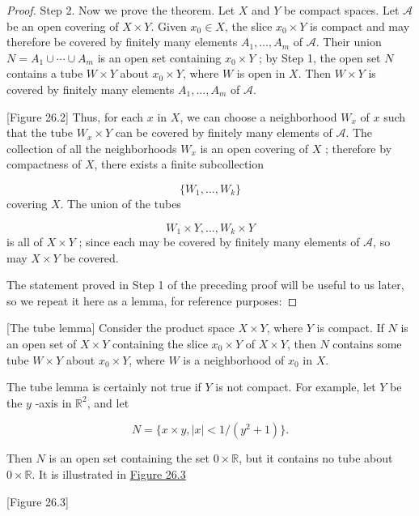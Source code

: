 \begin{proof}
Step 2. Now we prove the theorem. Let \(X\) and \(Y\) be compact spaces. Let \(\mathcal{A}\) be an open covering of \(X \times Y\). Given \(x_{0} \in X\), the slice \(x_{0} \times Y\) is compact and may therefore be covered by finitely many elements \(A_{1},\ldots ,A_{m}\) of \(\mathcal{A}\). Their union \(N = A_{1} \cup \cdots \cup {A}_{m}\) is an open set containing \(x_{0} \times Y\) ; by Step 1, the open set \(N\) contains a tube \(W \times Y\) about \(x_{0} \times Y\), where \(W\) is open in \(X\). Then \(W \times Y\) is covered by finitely many elements \(A_{1},\ldots ,A_{m}\) of \(\mathcal{A}\).

[Figure 26.2]
Thus, for each \(x\) in \(X\), we can choose a neighborhood \(W_{x}\) of \(x\) such that the tube \(W_{x} \times Y\) can be covered by finitely many elements of \(\mathcal{A}\). The collection of all the neighborhoods \(W_{x}\) is an open covering of \(X\) ; therefore by compactness of \(X\), there exists a finite subcollection

\[
\{ {W_{1},\ldots ,W_{k}}\}
\]
covering \(X\). The union of the tubes

\[
W_{1} \times Y,\ldots ,W_{k} \times Y
\]
is all of \(X \times Y\) ; since each may be covered by finitely many elements of \(\mathcal{A}\), so may \(X \times Y\) be covered.

The statement proved in Step 1 of the preceding proof will be useful to us later, so we repeat it here as a lemma, for reference purposes:
\end{proof}

\begin{lemma}
\label{lem:\thetheorem}[The tube lemma]
 Consider the product space \(X \times Y\), where \(Y\) is compact. If \(N\) is an open set of \(X \times Y\) containing the slice \(x_{0} \times Y\) of \(X \times Y\), then \(N\) contains some tube \(W \times Y\) about \(x_{0} \times Y\), where \(W\) is a neighborhood of \(x_{0}\) in \(X\).
\end{lemma}

\begin{centeredblock}
\begin{example}
\label{ex:\thesection.\theexample}
 The tube lemma is certainly not true if \(Y\) is not compact. For example, let \(Y\) be the \(y\) -axis in \(\mathbb{R}^{2}\), and let

\[
N = \{ {x \times y,| x| < 1/( {y^{2} + 1}) }\}.
\]

Then \(N\) is an open set containing the set \(0 \times \mathbb{R}\), but it contains no tube about \(0 \times \mathbb{R}\). It is illustrated in \hyperref[fig:26.3]{Figure 26.3}

[Figure 26.3]
\end{example}
\end{centeredblock}

